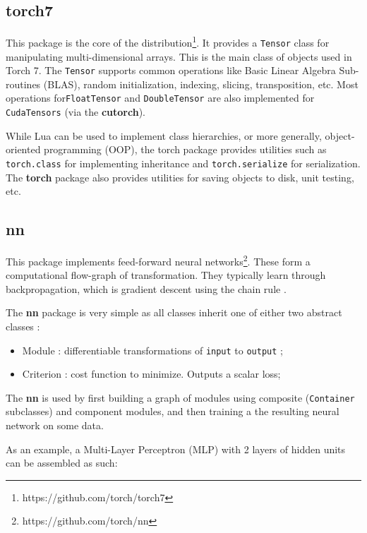 \documentclass{article} %
\providecommand{\inlinecode}[1]{\texttt{#1}}
\begin{document}
\subsection{torch7}

This package is the core of the distribution\footnote{https://github.com/torch/torch7}. 
It provides a \inlinecode{Tensor} class for manipulating multi-dimensional arrays.
This is the main class of objects used in Torch 7.
The \inlinecode{Tensor} supports common operations like Basic Linear Algebra Sub-routines (BLAS), 
random initialization, indexing, slicing, transposition, etc.
Most operations for\inlinecode{FloatTensor} and \inlinecode{DoubleTensor} 
are also implemented for \inlinecode{CudaTensors} (via the \textbf{cutorch}).


While Lua can be used to implement class hierarchies, 
or more generally, object-oriented programming (OOP),
the torch package provides utilities such as \inlinecode{torch.class} for implementing inheritance 
and \inlinecode{torch.serialize} for serialization. The \textbf{torch} package 
also provides utilities for saving objects to disk, unit testing, etc.

\subsection{nn}

This package implements feed-forward neural networks\footnote{https://github.com/torch/nn}.
These form a computational flow-graph of transformation.
They typically learn through backpropagation, 
which is gradient descent using the chain rule \cite{rumelhart2002learning}.

The \textbf{nn} package is very simple as all classes inherit one of either two abstract classes :

\begin{itemize} 
	\item Module : differentiable transformations of \inlinecode{input} to \inlinecode{output} ;
    \item Criterion : cost function to minimize. Outputs a scalar loss;
\end{itemize}

The \textbf{nn} is used by first building a graph of modules using 
composite (\inlinecode{Container} subclasses) and component modules,
and then training a the resulting neural network on some data.

As an example, a Multi-Layer Perceptron (MLP) with 2 layers of hidden units can be 
assembled as such:
\end{document}
